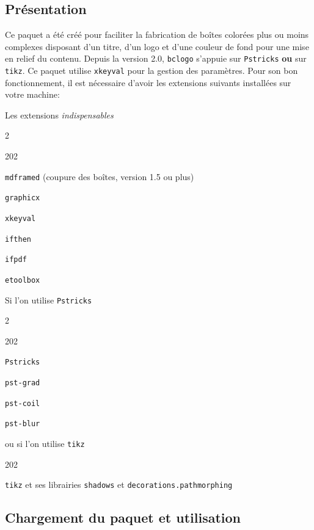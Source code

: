 \documentclass[a4paper,10pt,frenchb]{article}
\newenvironment{enum}{%
\begin{dingautolist}{202}}%
{\end{dingautolist}}%
\begin{document}
\subsection{Présentation}

Ce paquet a été créé pour faciliter la fabrication de boîtes colorées plus ou
moins complexes disposant d'un titre, d'un logo et d'une couleur de fond pour une mise en relief du contenu.
Depuis la version 2.0, \texttt{bclogo} s'appuie sur
\texttt{Pstricks} \textbf{ou} sur \texttt{tikz}. Ce paquet utilise \texttt{xkeyval} pour la gestion des
paramètres. Pour son bon fonctionnement, il est nécessaire d'avoir les extensions suivants
installées sur votre machine:

\begin{bclogo}[couleur=cPG, logo=\bcattention, cadreTitre=true, arrondi=0.1]{Les extensions \textit{indispensables}}%
\begin{multicols}{2}
\begin{enum}
\item \verb+mdframed+ (coupure des boîtes, version 1.5 ou plus)
\item \verb+graphicx+
\item \verb+xkeyval+
\item \verb+ifthen+
\item \verb+ifpdf+
\item \verb+etoolbox+
\end{enum}
\end{multicols}
\noindent Si l'on utilise \texttt{Pstricks}
\begin{multicols}{2}
  \begin{enum}
  \item \verb+Pstricks+
  \item \verb+pst-grad+
  \item \verb+pst-coil+
  \item \verb+pst-blur+
  \end{enum}
\end{multicols}
\noindent ou si l'on utilise \texttt{tikz}
  \begin{enum}
  \item \verb+tikz+ et ses librairies \texttt{shadows} et
\texttt{decorations.pathmorphing}
\end{enum}
\end{bclogo}

\subsection{Chargement du paquet et utilisation}
\end{document}
